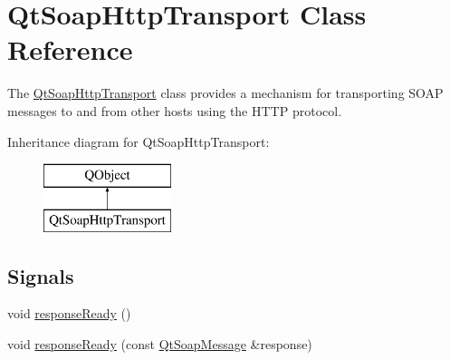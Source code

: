 \hypertarget{class_qt_soap_http_transport}{}\section{Qt\+Soap\+Http\+Transport Class Reference}
\label{class_qt_soap_http_transport}


The \mbox{\hyperlink{class_qt_soap_http_transport}{Qt\+Soap\+Http\+Transport}} class provides a mechanism for transporting S\+O\+AP messages to and from other hosts using the H\+T\+TP protocol.  


Inheritance diagram for Qt\+Soap\+Http\+Transport\+:\begin{figure}[H]
\begin{center}
\leavevmode
\includegraphics[height=2.000000cm]{class_qt_soap_http_transport}
\end{center}
\end{figure}
\subsection*{Signals}
\begin{DoxyCompactItemize}
\item 
void \mbox{\hyperlink{class_qt_soap_http_transport_a51f909d36a83ee62e0b3dccff3e340cf}{response\+Ready}} ()
\item 
void \mbox{\hyperlink{class_qt_soap_http_transport_a1d472301bc5c3ec56f204d22c3197c63}{response\+Ready}} (const \mbox{\hyperlink{class_qt_soap_message}{Qt\+Soap\+Message}} \&response)
\end{DoxyCompactItemize}
